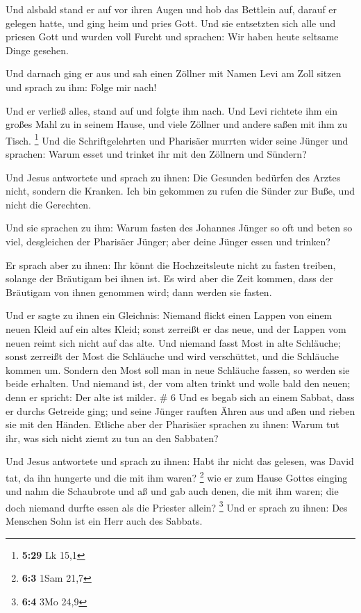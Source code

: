  Und alsbald stand er auf vor ihren Augen und hob das
Bettlein auf, darauf er gelegen hatte, und ging heim und pries Gott.
 Und sie entsetzten sich alle und priesen Gott und wurden
voll Furcht und sprachen: Wir haben heute seltsame Dinge gesehen.

 Und darnach ging er aus und sah einen Zöllner mit Namen
Levi am Zoll sitzen und sprach zu ihm: Folge mir nach!

 Und er verließ alles, stand auf und folgte ihm nach.
 Und Levi richtete ihm ein großes Mahl zu in seinem
Hause, und viele Zöllner und andere saßen mit ihm zu Tisch. \footnote{\textbf{5:29}
  Lk 15,1}  Und die Schriftgelehrten und Pharisäer
murrten wider seine Jünger und sprachen: Warum esset und trinket ihr mit
den Zöllnern und Sündern?

 Und Jesus antwortete und sprach zu ihnen: Die Gesunden
bedürfen des Arztes nicht, sondern die Kranken.  Ich bin
gekommen zu rufen die Sünder zur Buße, und nicht die Gerechten.

 Und sie sprachen zu ihm: Warum fasten des Johannes
Jünger so oft und beten so viel, desgleichen der Pharisäer Jünger; aber
deine Jünger essen und trinken?

 Er sprach aber zu ihnen: Ihr könnt die Hochzeitsleute
nicht zu fasten treiben, solange der Bräutigam bei ihnen ist.
 Es wird aber die Zeit kommen, dass der Bräutigam von
ihnen genommen wird; dann werden sie fasten.

 Und er sagte zu ihnen ein Gleichnis: Niemand flickt
einen Lappen von einem neuen Kleid auf ein altes Kleid; sonst zerreißt
er das neue, und der Lappen vom neuen reimt sich nicht auf das alte.
 Und niemand fasst Most in alte Schläuche; sonst zerreißt
der Most die Schläuche und wird verschüttet, und die Schläuche kommen
um.  Sondern den Most soll man in neue Schläuche fassen,
so werden sie beide erhalten.  Und niemand ist, der vom
alten trinkt und wolle bald den neuen; denn er spricht: Der alte ist
milder. \# 6  Und es begab sich an einem Sabbat, dass er
durchs Getreide ging; und seine Jünger rauften Ähren aus und aßen und
rieben sie mit den Händen.  Etliche aber der Pharisäer
sprachen zu ihnen: Warum tut ihr, was sich nicht ziemt zu tun an den
Sabbaten?

 Und Jesus antwortete und sprach zu ihnen: Habt ihr nicht
das gelesen, was David tat, da ihn hungerte und die mit ihm waren?
\footnote{\textbf{6:3} 1Sam 21,7}  wie er zum Hause Gottes
einging und nahm die Schaubrote und aß und gab auch denen, die mit ihm
waren; die doch niemand durfte essen als die Priester allein?
\footnote{\textbf{6:4} 3Mo 24,9}  Und er sprach zu ihnen:
Des Menschen Sohn ist ein Herr auch des Sabbats.

